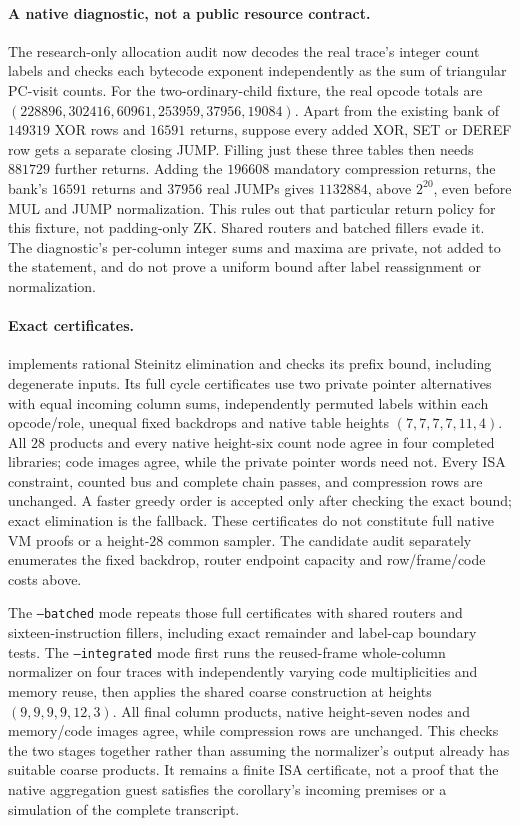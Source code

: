 \paragraph{A native diagnostic, not a public resource contract.} The research-only allocation audit now decodes the real trace's integer count labels and checks each bytecode exponent independently as the sum of triangular PC-visit counts. For the two-ordinary-child fixture, the real opcode totals are $(228896,302416,60961,253959,37956,19084)$. Apart from the existing bank of $149319$ XOR rows and $16591$ returns, suppose every added XOR, SET or DEREF row gets a separate closing JUMP. Filling just these three tables then needs $881729$ further returns. Adding the $196608$ mandatory compression returns, the bank's $16591$ returns and $37956$ real JUMPs gives $1132884$, above $2^{20}$, even before MUL and JUMP normalization. This rules out that particular return policy for this fixture, not padding-only ZK. Shared routers and batched fillers evade it. The diagnostic's per-column integer sums and maxima are private, not added to the statement, and do not prove a uniform bound after label reassignment or normalization.

\paragraph{Exact certificates.}  implements rational Steinitz elimination and checks its prefix bound, including degenerate inputs. Its full cycle certificates use two private pointer alternatives with equal incoming column sums, independently permuted labels within each opcode/role, unequal fixed backdrops and native table heights $(7,7,7,7,11,4)$. All $28$ products and every native height-six count node agree in four completed libraries; code images agree, while the private pointer words need not. Every ISA constraint, counted bus and complete chain passes, and compression rows are unchanged. A faster greedy order is accepted only after checking the exact bound; exact elimination is the fallback. These certificates do not constitute full native VM proofs or a height-$28$ common sampler. The candidate audit separately enumerates the fixed backdrop, router endpoint capacity and row/frame/code costs above.

The \texttt{--batched} mode repeats those full certificates with shared routers and sixteen-instruction fillers, including exact remainder and label-cap boundary tests. The \texttt{--integrated} mode first runs the reused-frame whole-column normalizer on four traces with independently varying code multiplicities and memory reuse, then applies the shared coarse construction at heights $(9,9,9,9,12,3)$. All final column products, native height-seven nodes and memory/code images agree, while compression rows are unchanged. This checks the two stages together rather than assuming the normalizer's output already has suitable coarse products. It remains a finite ISA certificate, not a proof that the native aggregation guest satisfies the corollary's incoming premises or a simulation of the complete transcript.
